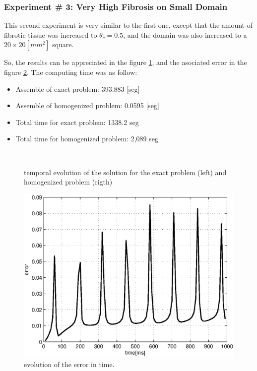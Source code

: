 \newpage
\subsubsection{Experiment \# 3: Very High Fibrosis on Small Domain}

 This second experiment is very similar to the first one, except that the amount of fibrotic tissue was increased to $\theta_c = 0.5$, and the domain was also increased to a $20 \times 20 [mm^2]$ square.

So, the results can be appreciated in the figure \ref{fig:mde_ex3}, and the asociated error in the figure \ref{fig:mde_ex3_error}. The computing time was as follow:

\begin{itemize}
\item Assemble of exact problem: 393.883 [seg]
\item Assemble of homogenized problem: 0.0595 [seg]
\item Total time for exact problem: 1338.2 seg
\item Total time for homogenized problem: 2,089 seg
\end{itemize}

\begin{figure}[H]
\centering
{} \\
\end{figure}

\begin{figure}[H]
\centering
{}   
\caption{temporal evolution of the solution for the exact problem (left) and homogenized problem (rigth)}\label{fig:mde_ex3}
\end{figure}

\begin{figure}[H]
\centering
\includegraphics[height = 6.4 cm]{fig/numerical_example_MDE_exp3_error}
\caption{evolution of the error in time.}\label{fig:mde_ex3_error}
\end{figure}

